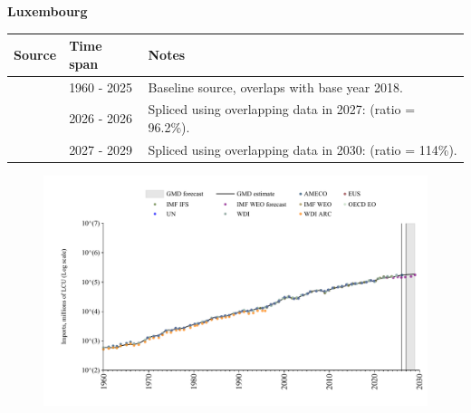 \documentclass[12pt,a4paper,landscape]{article}
\begin{document}
\begin{adjustbox}{max totalsize={\paperwidth}{\paperheight},center}
\begin{minipage}[t][\textheight][t]{\textwidth}
\vspace*{0.5cm}
{}
\begin{center}
{\Large\bfseries Luxembourg}
\end{center}
\vspace{0.5cm}
\begin{table}[H]
\centering
\small
\begin{tabular}{|l|l|l|}
\hline
\textbf{Source} & \textbf{Time span} & \textbf{Notes} \\
\hline
\rowcolor{white}\cite{OECD_EO}& 1960 - 2025 &Baseline source, overlaps with base year 2018.\\
\rowcolor{lightgray}\cite{AMECO}& 2026 - 2026 &Spliced using overlapping data in 2027: (ratio = 96.2\%).\\
\rowcolor{white}\cite{IMF_WEO_forecast}& 2027 - 2029 &Spliced using overlapping data in 2030: (ratio = 114\%).\\
\hline
\end{tabular}
\end{table}
\begin{figure}[H]
\centering
\includegraphics[width=\textwidth,height=0.6\textheight,keepaspectratio]{graphs/LUX_imports.pdf}
\end{figure}
\end{minipage}
\end{adjustbox}
\end{document}
